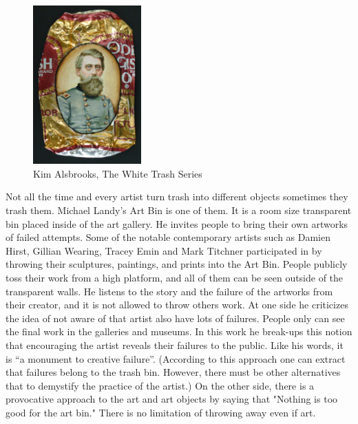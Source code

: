 \begin{figure}
  \begin{center}
    \includegraphics[width=0.37\textwidth]{graphics/Alsbrooks.jpg}
  \end{center}
  \caption{Kim Alsbrooks, The White Trash Series}
  \label{fig:Alsbrooks}
\end{figure}

Not all the time and every artist turn trash into different objects sometimes they trash them. Michael Landy's Art Bin is one of them. It is a room size transparent bin placed inside of the art gallery. He invites people to bring their own artworks of failed attempts. Some of the notable contemporary artists such as Damien Hirst, Gillian Wearing, Tracey Emin and Mark Titchner participated in by throwing their sculptures, paintings, and prints into the Art Bin. People publicly toss their work from a high platform, and all of them can be seen outside of the transparent walls. He listens to the story and the failure of the artworks from their creator, and it is not allowed to throw others work. At one side he criticizes the idea of not aware of that artist also have lots of failures. People only can see the final work in the galleries and museums. In this work he break-ups this notion that encouraging the artist reveals their failures to the public. Like his words, it is “a monument to creative failure”. (According to this approach one can extract that failures belong to the trash bin. However, there must be other alternatives that to demystify the practice of the artist.) On the other side, there is a provocative approach to the art and art objects by saying that "Nothing is too good for the art bin." There is no limitation of throwing away even if art. 

